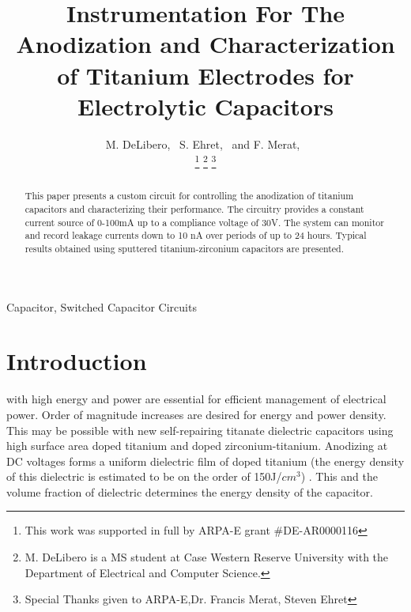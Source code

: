 \documentclass[journal]{IEEEtran}
\begin{document}
\title{Instrumentation For The Anodization and Characterization of Titanium Electrodes for Electrolytic Capacitors}

\author{M. DeLibero,~
        S. Ehret,~
        and F. Merat,~%

\thanks{This work was supported in full by ARPA-E grant \#DE-AR0000116}
\thanks{M. DeLibero is a MS student at Case Western Reserve University with the Department
of Electrical and Computer Science.}%
\thanks{Special Thanks given to ARPA-E,Dr. Francis Merat, Steven Ehret}}

\maketitle

\begin{abstract}
This paper presents a custom circuit for controlling the anodization of titanium capacitors and characterizing their performance. The circuitry provides a constant current source of 0-100mA up to a compliance voltage of 30V. The system can monitor and record leakage currents down to 10 nA over periods of up to 24 hours. Typical results obtained using sputtered titanium-zirconium capacitors are presented.
\end{abstract}

\begin{IEEEkeywords}
Capacitor, Switched Capacitor Circuits
\end{IEEEkeywords}

\IEEEpeerreviewmaketitle

\section{Introduction}

 with high energy and power are essential for efficient management of electrical power.  Order of magnitude increases are desired for energy and power density. This may be possible with new self-repairing titanate dielectric capacitors using high surface area doped titanium and doped zirconium-titanium.  Anodizing at DC voltages forms a uniform dielectric film of doped titanium (the energy density of this dielectric is estimated to be on the order of 150J/$cm^3$) \cite{tiSponge}. This and the volume fraction of dielectric determines the energy density of the capacitor.
\end{document}

